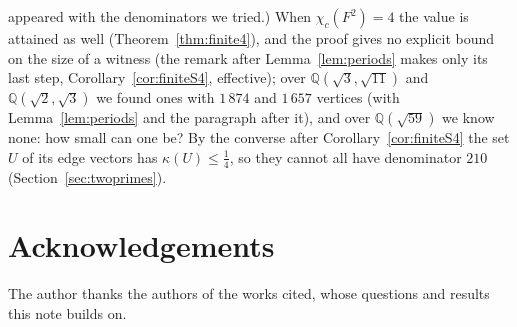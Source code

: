 \documentclass[11pt,a4paper]{amsart}
\theoremstyle{remark}
\newcommand{\Q}{\mathbb{Q}}
\begin{document}
\begin{enumerate}
appeared with the denominators we tried.)
When $\chi_c(F^2)=4$ the value is attained as well (Theorem~\ref{thm:finite4}), and the proof gives no explicit bound
on the size of a witness (the remark after Lemma~\ref{lem:periods} makes only its last step,
Corollary~\ref{cor:finiteS4}, effective); over $\Q(\sqrt3,\sqrt{11})$ and $\Q(\sqrt2,\sqrt3)$ we found ones with
$1\,874$ and $1\,657$ vertices (with Lemma~\ref{lem:periods} and the paragraph after it), and over $\Q(\sqrt{59})$ we
know none: how small can one be? By the converse after Corollary~\ref{cor:finiteS4} the set $U$ of its edge vectors
has $\kappa(U)\le\frac14$, so they cannot all have denominator $210$ (Section~\ref{sec:twoprimes}).
\end{enumerate}

\section*{Acknowledgements}
The author thanks the authors of the works cited, whose questions and results this note builds on.
\end{document}
